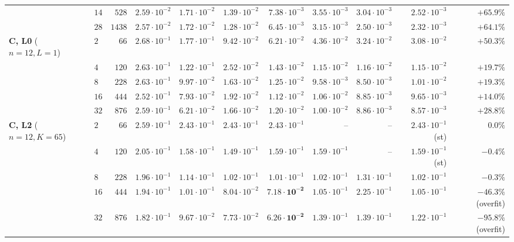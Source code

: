 \begin{table}[!htbp]
{\begin{tabular}{@{}llrrrrrrrrr@{}}
 & $14$ & $528$  & $2.59\cdot 10^{-2}$ & $1.71\cdot 10^{-2}$ & $1.39\cdot 10^{-2}$ & $7.38\cdot 10^{-3}$ & $3.55\cdot 10^{-3}$ & $3.04\cdot 10^{-3}$ & $2.52\cdot 10^{-3}$ & $\mathbf{+65.9\%}$ \\
 & $28$ & $1438$ & $2.57\cdot 10^{-2}$ & $1.72\cdot 10^{-2}$ & $1.28\cdot 10^{-2}$ & $6.45\cdot 10^{-3}$ & $3.15\cdot 10^{-3}$ & $2.50\cdot 10^{-3}$ & $2.32\cdot 10^{-3}$ & $\mathbf{+64.1\%}$ \\
\midrule
\textbf{C, L0} ($n{=}12, L{=}1$)
 & $2$  & $66$  & $2.68\cdot 10^{-1}$ & $1.77\cdot 10^{-1}$ & $9.42\cdot 10^{-2}$ & $6.21\cdot 10^{-2}$ & $4.36\cdot 10^{-2}$ & $3.24\cdot 10^{-2}$ & $3.08\cdot 10^{-2}$ & $\mathbf{+50.3\%}$ \\
 & $4$  & $120$ & $2.63\cdot 10^{-1}$ & $1.22\cdot 10^{-1}$ & $2.52\cdot 10^{-2}$ & $1.43\cdot 10^{-2}$ & $1.15\cdot 10^{-2}$ & $1.16\cdot 10^{-2}$ & $1.15\cdot 10^{-2}$ & $\mathbf{+19.7\%}$ \\
 & $8$  & $228$ & $2.63\cdot 10^{-1}$ & $9.97\cdot 10^{-2}$ & $1.63\cdot 10^{-2}$ & $1.25\cdot 10^{-2}$ & $9.58\cdot 10^{-3}$ & $8.50\cdot 10^{-3}$ & $1.01\cdot 10^{-2}$ & $\mathbf{+19.3\%}$ \\
 & $16$ & $444$ & $2.52\cdot 10^{-1}$ & $7.93\cdot 10^{-2}$ & $1.92\cdot 10^{-2}$ & $1.12\cdot 10^{-2}$ & $1.06\cdot 10^{-2}$ & $8.85\cdot 10^{-3}$ & $9.65\cdot 10^{-3}$ & $\mathbf{+14.0\%}$ \\
 & $32$ & $876$ & $2.59\cdot 10^{-1}$ & $6.21\cdot 10^{-2}$ & $1.66\cdot 10^{-2}$ & $1.20\cdot 10^{-2}$ & $1.00\cdot 10^{-2}$ & $8.86\cdot 10^{-3}$ & $8.57\cdot 10^{-3}$ & $\mathbf{+28.8\%}$ \\
\midrule
\textbf{C, L2} ($n{=}12, K{=}65$)
 & $2$  & $66$  & $2.59\cdot 10^{-1}$ & $2.43\cdot 10^{-1}$ & $2.43\cdot 10^{-1}$ & $2.43\cdot 10^{-1}$ & -- & -- & $2.43\cdot 10^{-1}$ (st) & $0.0\%$ \\
 & $4$  & $120$ & $2.05\cdot 10^{-1}$ & $1.58\cdot 10^{-1}$ & $1.49\cdot 10^{-1}$ & $1.59\cdot 10^{-1}$ & $1.59\cdot 10^{-1}$ & -- & $1.59\cdot 10^{-1}$ (st) & $-0.4\%$ \\
 & $8$  & $228$ & $1.96\cdot 10^{-1}$ & $1.14\cdot 10^{-1}$ & $1.02\cdot 10^{-1}$ & $1.01\cdot 10^{-1}$ & $1.02\cdot 10^{-1}$ & $1.31\cdot 10^{-1}$ & $1.02\cdot 10^{-1}$ & $-0.3\%$ \\
 & $16$ & $444$ & $1.94\cdot 10^{-1}$ & $1.01\cdot 10^{-1}$ & $8.04\cdot 10^{-2}$ & $\mathbf{7.18\cdot 10^{-2}}$ & $1.05\cdot 10^{-1}$ & $2.25\cdot 10^{-1}$ & $1.05\cdot 10^{-1}$ & $\mathbf{-46.3\%}$ (overfit) \\
 & $32$ & $876$ & $1.82\cdot 10^{-1}$ & $9.67\cdot 10^{-2}$ & $7.73\cdot 10^{-2}$ & $\mathbf{6.26\cdot 10^{-2}}$ & $1.39\cdot 10^{-1}$ & $1.39\cdot 10^{-1}$ & $1.22\cdot 10^{-1}$ & $\mathbf{-95.8\%}$ (overfit) \\
\bottomrule
\end{tabular}
}
\end{table}


